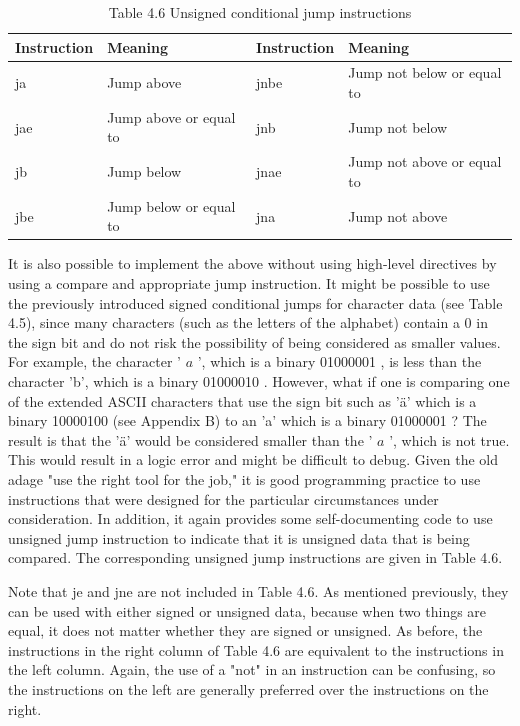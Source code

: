 \documentclass[10pt]{book}
\begin{document}
\begin{table}[htbp]
\begin{center}
\captionsetup{labelformat=empty}
\caption{Table 4.6 Unsigned conditional jump instructions}
\begin{tabular}{|l|l|l|l|}
\hline
Instruction & Meaning & Instruction & Meaning \\

\hline
ja & Jump above & jnbe & Jump not below or equal to \\
\hline
jae & Jump above or equal to & jnb & Jump not below \\
\hline
jb & Jump below & jnae & Jump not above or equal to \\
\hline
jbe & Jump below or equal to & jna & Jump not above \\
\hline
\end{tabular}
\end{center}
\end{table}

It is also possible to implement the above without using high-level directives by using a compare and appropriate jump instruction. It might be possible to use the previously introduced signed conditional jumps for character data (see Table 4.5), since many characters (such as the letters of the alphabet) contain a 0 in the sign bit and do not risk the possibility of being considered as smaller values. For example, the character ' $a$ ', which is a binary 01000001 , is less than the character 'b', which is a binary 01000010 . However, what if one is comparing one of the extended ASCII characters that use the sign bit such as 'ä' which is a binary 10000100 (see Appendix B) to an 'a' which is a binary 01000001 ? The result is that the 'ä' would be considered smaller than the ' $a$ ', which is not true. This would result in a logic error and might be difficult to debug. Given the old adage "use the right tool for the job," it is good programming practice to use instructions that were designed for the particular circumstances under consideration. In addition, it again provides some self-documenting code to use unsigned jump instruction to indicate that it is unsigned data that is being compared. The corresponding unsigned jump instructions are given in Table 4.6.


Note that je and jne are not included in Table 4.6. As mentioned previously, they can be used with either signed or unsigned data, because when two things are equal, it does not matter whether they are signed or unsigned. As before, the instructions in the right column of Table 4.6 are equivalent to the instructions in the left column. Again, the use of a "not" in an instruction can be confusing, so the instructions on the left are generally preferred over the instructions on the right.
\end{document}
